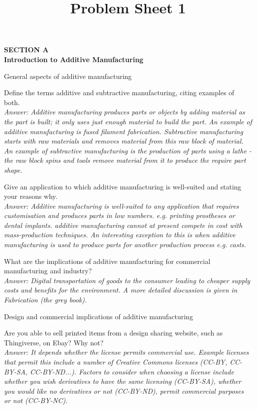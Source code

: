\documentclass{article}
\title{Problem Sheet 1}
\newcommand\AM{additive manufacturing }
\begin{document}
\vspace{5mm}

\begin{center}
  \large{\bf SECTION A\\[5mm]
    Introduction to Additive Manufacturing}\\[20mm]
\end{center}


\begin{questions}
\item General aspects of \AM
\begin{questions}
 \item Define the terms additive and subtractive manufacturing, citing examples of both. 
 \\[0.2cm] \emph{Answer: Additive manufacturing produces parts or objects by adding material as the part is built; it only uses just enough material to build the part. An example of additive manufacturing is fused filament fabrication. Subtractive manufacturing starts with raw materials and removes material from this raw block of material. An example of subtractive manufacturing is the production of parts using a lathe - the raw block spins and tools remove material from it to produce the require part shape. }
 \item Give an application to which \AM is well-suited and stating your reasons why. 
 \\[0.2cm] \emph{Answer: Additive manufacturing is well-suited to any application that requires customisation and produces parts in low numbers. e.g. printing prostheses or dental implants. \AM cannot at present compete in cost with mass-production techniques. An interesting exception to this is when additive manufacturing is used to produce parts for another production process e.g. casts. }
 \item What are the implications of \AM for commercial manufacturing and industry? 
 \\[0.2cm] \emph{Answer: Digital transportation of goods to the consumer leading to cheaper supply costs and benefits for the environment. A more detailed discussion is given in Fabrication (the grey book).}
 \end{questions}
 \item Design and commercial implications of \AM
\begin{questions}
  \item Are you able to sell printed items from a design sharing website, such as Thingiverse, on Ebay? Why not?
  \\[0.2cm] \emph{Answer: It depends whether the license permits commercial use. Example licenses that permit this include a number of Creative Commons licenses (CC-BY, CC-BY-SA, CC-BY-ND...). Factors to consider when choosing a license include whether you wish derivatives to have the same licensing (CC-BY-SA), whether you would like no derivatives or not (CC-BY-ND), permit commercial purposes or not (CC-BY-NC).}

\end{questions}
\end{questions}
\end{document}
